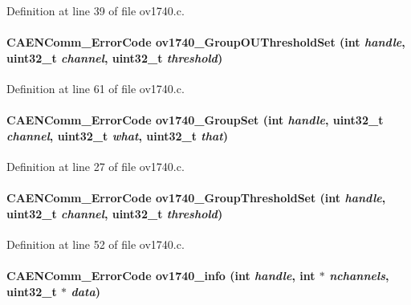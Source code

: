 Definition at line 39 of file ov1740.c.
\paragraph[{ov1740\_\-GroupOUThresholdSet}]{\setlength{\rightskip}{0pt plus 5cm}CAENComm\_\-ErrorCode ov1740\_\-GroupOUThresholdSet (int {\em handle}, \/  uint32\_\-t {\em channel}, \/  uint32\_\-t {\em threshold})}\hfill\label{ov1740drv_8h_ac4f9aa7362df12c907d717831d16fe98}


Definition at line 61 of file ov1740.c.
\paragraph[{ov1740\_\-GroupSet}]{\setlength{\rightskip}{0pt plus 5cm}CAENComm\_\-ErrorCode ov1740\_\-GroupSet (int {\em handle}, \/  uint32\_\-t {\em channel}, \/  uint32\_\-t {\em what}, \/  uint32\_\-t {\em that})}\hfill\label{ov1740drv_8h_ab50e78553643da4ad04e9b3a952da71d}


Definition at line 27 of file ov1740.c.
\paragraph[{ov1740\_\-GroupThresholdSet}]{\setlength{\rightskip}{0pt plus 5cm}CAENComm\_\-ErrorCode ov1740\_\-GroupThresholdSet (int {\em handle}, \/  uint32\_\-t {\em channel}, \/  uint32\_\-t {\em threshold})}\hfill\label{ov1740drv_8h_ae25b7a625758fcc417ddf995d34f9b62}


Definition at line 52 of file ov1740.c.
\paragraph[{ov1740\_\-info}]{\setlength{\rightskip}{0pt plus 5cm}CAENComm\_\-ErrorCode ov1740\_\-info (int {\em handle}, \/  int $\ast$ {\em nchannels}, \/  uint32\_\-t $\ast$ {\em data})}\hfill\label{ov1740drv_8h_a69ac1d4b3d97aec1e9f5fd51bfd0dc84}


